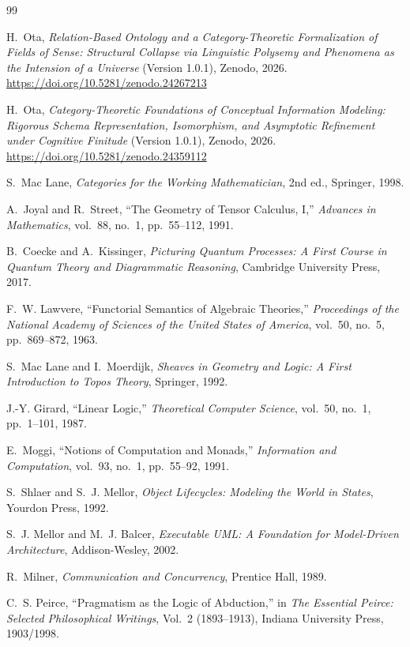 \documentclass[11pt,a4paper]{article}
\theoremstyle{definition}
\theoremstyle{plain}
\theoremstyle{remark}
\begin{document}
\begin{thebibliography}{99}

H.~Ota, \emph{Relation-Based Ontology and a Category-Theoretic Formalization of Fields of Sense: Structural Collapse via Linguistic Polysemy and Phenomena as the Intension of a Universe} (Version 1.0.1), Zenodo, 2026. \url{https://doi.org/10.5281/zenodo.24267213}

H.~Ota, \emph{Category-Theoretic Foundations of Conceptual Information Modeling: Rigorous Schema Representation, Isomorphism, and Asymptotic Refinement under Cognitive Finitude} (Version 1.0.1), Zenodo, 2026. \url{https://doi.org/10.5281/zenodo.24359112}

S.~Mac Lane, \emph{Categories for the Working Mathematician}, 2nd ed., Springer, 1998.

A.~Joyal and R.~Street, ``The Geometry of Tensor Calculus, I,'' \emph{Advances in Mathematics}, vol.~88, no.~1, pp.~55--112, 1991.

B.~Coecke and A.~Kissinger, \emph{Picturing Quantum Processes: A First Course in Quantum Theory and Diagrammatic Reasoning}, Cambridge University Press, 2017.

F.~W. Lawvere, ``Functorial Semantics of Algebraic Theories,'' \emph{Proceedings of the National Academy of Sciences of the United States of America}, vol.~50, no.~5, pp.~869--872, 1963.

S.~Mac Lane and I.~Moerdijk, \emph{Sheaves in Geometry and Logic: A First Introduction to Topos Theory}, Springer, 1992.

J.-Y. Girard, ``Linear Logic,'' \emph{Theoretical Computer Science}, vol.~50, no.~1, pp.~1--101, 1987.

E.~Moggi, ``Notions of Computation and Monads,'' \emph{Information and Computation}, vol.~93, no.~1, pp.~55--92, 1991.

S.~Shlaer and S.~J. Mellor, \emph{Object Lifecycles: Modeling the World in States}, Yourdon Press, 1992.

S.~J. Mellor and M.~J. Balcer, \emph{Executable UML: A Foundation for Model-Driven Architecture}, Addison-Wesley, 2002.

R.~Milner, \emph{Communication and Concurrency}, Prentice Hall, 1989.

C.~S. Peirce, ``Pragmatism as the Logic of Abduction,'' in \emph{The Essential Peirce: Selected Philosophical Writings}, Vol.~2 (1893--1913), Indiana University Press, 1903/1998.


\end{thebibliography}
\end{document}
